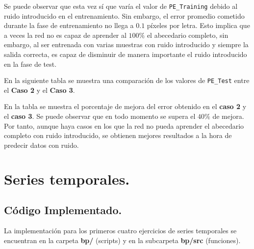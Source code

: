 \documentclass[spanish]{assignment}
\begin{document}
	Se puede observar que esta vez sí que varía el valor de \texttt{PE\_Training} debido al ruido introducido en el entrenamiento. Sin embargo, el error promedio cometido durante la fase de entrenamiento no llega a $0.1$ píxeles por letra. Esto implica que a veces la red no es capaz de aprender al $100\%$ el abecedario completo, sin embargo, al ser entrenada con varias muestras con ruido introducido y siempre la salida correcta, es capaz de disminuir de manera importante el ruido introducido en la fase de test.
	
	En la siguiente tabla se muestra una comparación de los valores de \texttt{PE\_Test} entre el \textbf{Caso 2} y el \textbf{Caso 3}.
	
	\vspace{5mm}
	\noindent{}
	\vspace{5mm}
	
	En la tabla se muestra el porcentaje de mejora del error obtenido en el \textbf{caso 2} y el \textbf{caso 3}. Se puede observar que en todo momento se supera el $40\%$ de mejora. Por tanto, aunque haya casos en los que la red no pueda aprender el abecedario completo con ruido introducido, se obtienen mejores resultados a la hora de predecir datos con ruido.
		
	\newpage
	\section{Series temporales.}
	\subsection{Código Implementado.}
	La implementación para los primeros cuatro ejercicios de series temporales se encuentran en la carpeta \textbf{bp/} (scripts) y en la subcarpeta \textbf{bp/src} (funciones).\\
\end{document}
